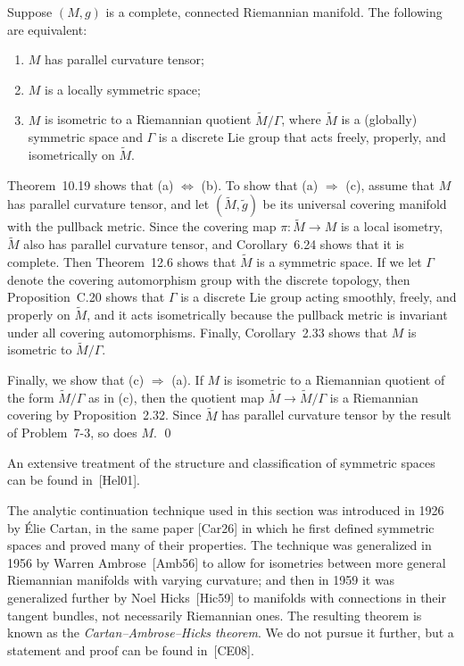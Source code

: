 \begin{corollary}
\label{cor:symmetric-space-equivalence}

Suppose $(M, g)$ is a complete, connected Riemannian manifold. The following are equivalent:
\begin{enumerate}
\item[(a)] $M$ has parallel curvature tensor;
\item[(b)] $M$ is a locally symmetric space;
\item[(c)] $M$ is isometric to a Riemannian quotient $\tilde{M}/\Gamma$, where $\tilde{M}$ is a (globally) symmetric space and $\Gamma$ is a discrete Lie group that acts freely, properly, and isometrically on $\tilde{M}$.
\end{enumerate}
\end{corollary}

Theorem~10.19 shows that (a) $\iff$ (b). To show that (a) $\Rightarrow$ (c), assume that $M$ has parallel curvature tensor, and let $(\tilde{M}, \tilde{g})$ be its universal covering manifold with the pullback metric. Since the covering map $\pi : \tilde{M} \to M$ is a local isometry, $\tilde{M}$ also has parallel curvature tensor, and Corollary~6.24 shows that it is complete. Then Theorem~12.6 shows that $\tilde{M}$ is a symmetric space. If we let $\Gamma$ denote the covering automorphism group with the discrete topology, then Proposition~C.20 shows that $\Gamma$ is a discrete Lie group acting smoothly, freely, and properly on $\tilde{M}$, and it acts isometrically because the pullback metric is invariant under all covering automorphisms. Finally, Corollary~2.33 shows that $M$ is isometric to $\tilde{M}/\Gamma$.

Finally, we show that (c) $\Rightarrow$ (a). If $M$ is isometric to a Riemannian quotient of the form $\tilde{M}/\Gamma$ as in (c), then the quotient map $\tilde{M} \to \tilde{M}/\Gamma$ is a Riemannian covering by Proposition~2.32. Since $\tilde{M}$ has parallel curvature tensor by the result of Problem~7-3, so does $M$. \qed

An extensive treatment of the structure and classification of symmetric spaces can be found in~[Hel01].

The analytic continuation technique used in this section was introduced in 1926 by \'Elie Cartan, in the same paper [Car26] in which he first defined symmetric spaces and proved many of their properties. The technique was generalized in 1956 by Warren Ambrose~[Amb56] to allow for isometries between more general Riemannian manifolds with varying curvature; and then in 1959 it was generalized further by Noel Hicks~[Hic59] to manifolds with connections in their tangent bundles, not necessarily Riemannian ones. The resulting theorem is known as the \emph{Cartan--Ambrose--Hicks theorem}. We do not pursue it further, but a statement and proof can be found in~[CE08].


